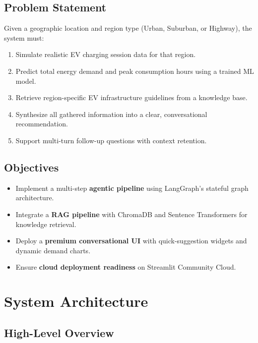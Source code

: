 \documentclass[12pt,a4paper]{article}
\begin{document}
\subsection{Problem Statement}
Given a geographic location and region type (Urban, Suburban, or Highway), the system must:
\begin{enumerate}[leftmargin=2cm]
    \item Simulate realistic EV charging session data for that region.
    \item Predict total energy demand and peak consumption hours using a trained ML model.
    \item Retrieve region-specific EV infrastructure guidelines from a knowledge base.
    \item Synthesize all gathered information into a clear, conversational recommendation.
    \item Support multi-turn follow-up questions with context retention.
\end{enumerate}

\subsection{Objectives}
\begin{itemize}
    \item Implement a multi-step \textbf{agentic pipeline} using LangGraph's stateful graph architecture.
    \item Integrate a \textbf{RAG pipeline} with ChromaDB and Sentence Transformers for knowledge retrieval.
    \item Deploy a \textbf{premium conversational UI} with quick-suggestion widgets and dynamic demand charts.
    \item Ensure \textbf{cloud deployment readiness} on Streamlit Community Cloud.
\end{itemize}

\newpage

\section{System Architecture}

\subsection{High-Level Overview}
\end{document}

